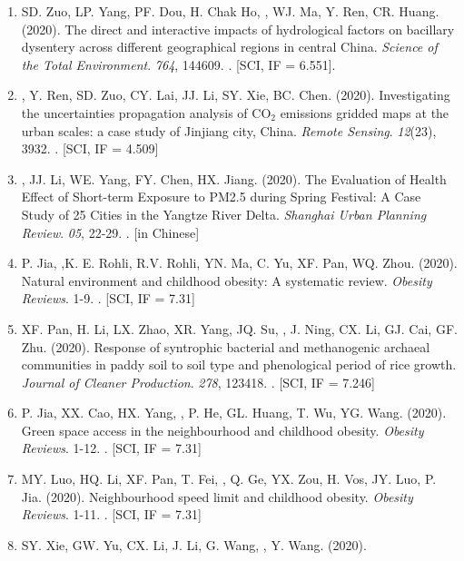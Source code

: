 \begin{enumerate}
\item
    SD. Zuo, LP. Yang, PF. Dou, H. Chak Ho, \Shaoqing, WJ. Ma, Y. Ren, CR. Huang. (2020).
    The direct and interactive impacts of hydrological factors on bacillary dysentery across different geographical regions in central China.
    \textit{Science of the Total Environment}. \textit{764}, 144609.
    . [SCI, IF = 6.551].
\item
    \Shaoqing\CF, Y. Ren, SD. Zuo, CY. Lai, JJ. Li, SY. Xie, BC. Chen. (2020).
    Investigating the uncertainties propagation analysis of CO$_2$ emissions gridded maps at the urban scales: a case study of Jinjiang city, China. 
    \textit{Remote Sensing}. \textit{12}(23), 3932.
    . [SCI, IF = 4.509]
\item
    \Shaoqing, JJ. Li, WE. Yang, FY. Chen, HX. Jiang. (2020).
    The Evaluation of Health Effect of Short-term Exposure to PM2.5 during Spring Festival: A Case Study of 25 Cities in the Yangtze River Delta.
    \textit{Shanghai Urban Planning Review}. \textit{05}, 22-29.
    . [in Chinese] 
\item
    P. Jia, \Shaoqing,K. E. Rohli, R.V. Rohli, YN. Ma, C. Yu, XF. Pan, WQ. Zhou. (2020).
    Natural environment and childhood obesity: A systematic review.
    \textit{Obesity Reviews}. 1-9.
    . [SCI, IF = 7.31]
\item
    XF. Pan, H. Li, LX. Zhao, XR. Yang, JQ. Su, \Shaoqing, J. Ning, CX. Li, GJ. Cai, GF. Zhu. (2020).
    Response of syntrophic bacterial and methanogenic archaeal communities in paddy soil to soil type and phenological period of rice growth.
    \textit{Journal of Cleaner Production}. \textit{278}, 123418.
    . [SCI, IF = 7.246]
\item
    P. Jia, XX. Cao, HX. Yang, \Shaoqing, P. He, GL. Huang, T. Wu, YG. Wang. (2020).
    Green space access in the neighbourhood and childhood obesity.
    \textit{Obesity Reviews}. 1-12.
    . [SCI, IF = 7.31]
\item
    MY. Luo, HQ. Li, XF. Pan, T. Fei, \Shaoqing, Q. Ge, YX. Zou, H. Vos, JY. Luo, P. Jia. (2020).
    Neighbourhood speed limit and childhood obesity.
    \textit{Obesity Reviews}. 1-11.
    . [SCI, IF = 7.31]
\item
    SY. Xie, GW. Yu, CX. Li, J. Li, G. Wang, \Shaoqing, Y. Wang. (2020).

\end{enumerate}
